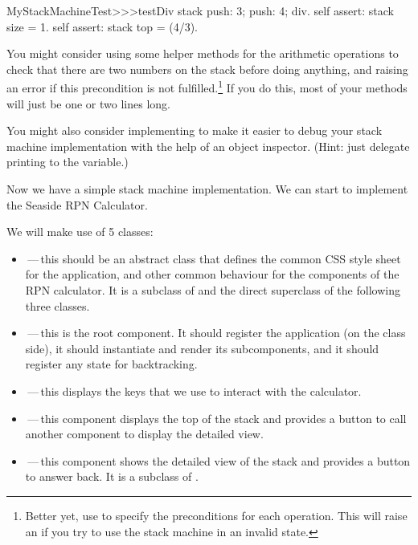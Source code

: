 \documentclass[a4paper,10pt,twoside]{book}
\begin{document}

\begin{code}{}
MyStackMachineTest>>>testDiv
	stack
		push: 3;
		push: 4;
		div.
	self assert: stack size = 1.
	self assert: stack top = (4/3).
\end{code}

You might consider using some helper methods for the arithmetic operations to check that there are two numbers on the stack before doing anything, and raising an error if this precondition is not fulfilled.\footnote{Better yet, use  to specify the preconditions for each operation.
This will raise an  if you try to use the stack machine in an invalid state.}
If you do this, most  of your methods will just be one or two lines long.

You might also consider implementing  to make it easier to debug your stack machine implementation with the help of an object inspector.
(Hint: just delegate printing to the  variable.)


Now we have a simple stack machine implementation.
We can start to implement the Seaside RPN Calculator.

We will make use of 5 classes:
\begin{itemize}
  \item {}\,---\,this should be an abstract class that defines the common CSS style sheet for the application, and other common behaviour for the components of the RPN calculator.
  It is a subclass of  and the direct superclass of the following three classes.
  \item {}\,---\,this is the root component.
  It should register the application (on the class side), it should instantiate and render its subcomponents, and it should register any state for backtracking.
  \item {}\,---\,this displays the keys that we use to interact with the calculator.
  \item {}\,---\,this component displays the top of the stack and provides a button to call another component to display the detailed view.
  \item {}\,---\,this component shows the detailed view of the stack and provides a button to answer back.
  It is a subclass of .
\end{itemize}
\end{document}
